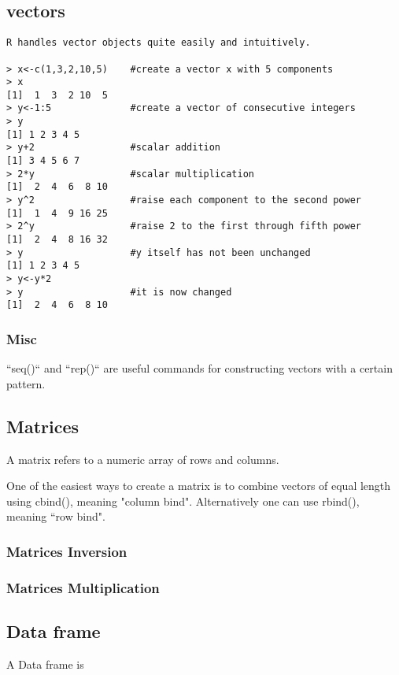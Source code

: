 \begin{itemize}
\subsection{vectors}
\begin{framed}
\begin{verbatim}
R handles vector objects quite easily and intuitively.

> x<-c(1,3,2,10,5)    #create a vector x with 5 components
> x
[1]  1  3  2 10  5
> y<-1:5              #create a vector of consecutive integers
> y
[1] 1 2 3 4 5
> y+2                 #scalar addition
[1] 3 4 5 6 7
> 2*y                 #scalar multiplication
[1]  2  4  6  8 10
> y^2                 #raise each component to the second power
[1]  1  4  9 16 25
> 2^y                 #raise 2 to the first through fifth power
[1]  2  4  8 16 32
> y                   #y itself has not been unchanged
[1] 1 2 3 4 5
> y<-y*2
> y                   #it is now changed
[1]  2  4  6  8 10
\end{verbatim}
\end{framed}

\subsubsection{Misc}
``seq()`` and ``rep()`` are useful commands for constructing vectors with a certain pattern.

%

\subsection{Matrices}
A matrix refers to a numeric array of rows and columns.

One of the easiest ways to create a matrix is to combine vectors of equal
length using cbind(), meaning "column bind". Alternatively one can use rbind(), meaning ``row bind".


\subsubsection{Matrices Inversion}
\subsubsection{Matrices Multiplication}


\subsection{Data frame}
A Data frame is
\newpage


\end{itemize}

